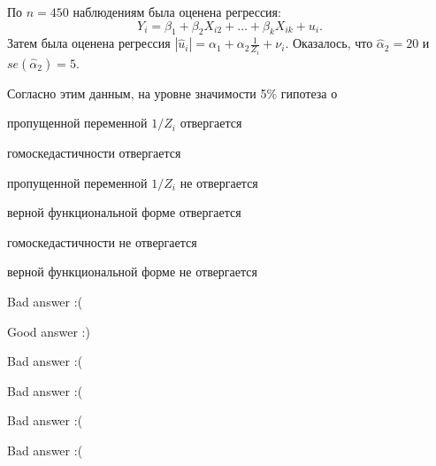 
\begin{question}
По \(n=450\) наблюдениям была оценена регрессия:
\[
Y_i = \beta_1 + \beta_2 X_{i2} + \ldots + \beta_k X_{ik} + u_i.
\]
Затем была оценена регрессия \(|\hat u_i| = \alpha_1 + \alpha_2 \frac{1}{Z_i} + \nu_i\).
Оказалось, что \(\hat\alpha_2 = 20\) и \(se(\hat\alpha_2) = 5\).

Согласно этим данным, на уровне значимости 5\% гипотеза о
\begin{answerlist}
  \item пропущенной переменной \(1/Z_{i}\) отвергается
  \item гомоскедастичности отвергается
  \item пропущенной переменной \(1/Z_{i}\) не отвергается
  \item верной функциональной форме отвергается
  \item гомоскедастичности не отвергается
  \item верной функциональной форме не отвергается
\end{answerlist}
\end{question}

\begin{solution}
\begin{answerlist}
  \item Bad answer :(
  \item Good answer :)
  \item Bad answer :(
  \item Bad answer :(
  \item Bad answer :(
  \item Bad answer :(
\end{answerlist}
\end{solution}

